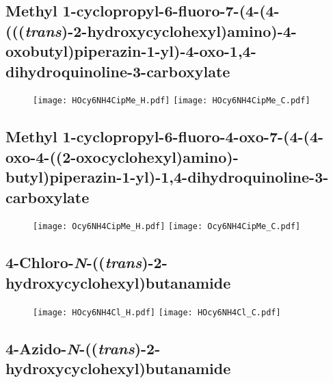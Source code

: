\subsection{Methyl 1\hyp{}cyclopropyl\hyp{}6\hyp{}fluoro\hyp{}7\hyp{}(4\hyp{}(4\hyp{}(((\textit{trans})\hyp{}2\hyp{}hydroxycyclohexyl)amino)\hyp{}4\hyp{}oxobutyl)piperazin\hyp{}1\hyp{}yl)\hyp{}4\hyp{}oxo\hyp{}1,4\hyp{}dihydroquinoline\hyp{}3\hyp{}carboxylate }

\begin{figure}[H]
	\centering
		\texttt{[image: HOcy6NH4CipMe\_H.pdf]}
		\texttt{[image: HOcy6NH4CipMe\_C.pdf]}
\end{figure}

\subsection{Methyl 1\hyp{}cyclopropyl\hyp{}6\hyp{}fluoro\hyp{}4\hyp{}oxo\hyp{}7\hyp{}(4\hyp{}(4\hyp{}oxo\hyp{}4\hyp{}((2\hyp{}oxocyclohexyl)amino)\hyp{}butyl)piperazin\hyp{}1\hyp{}yl)\hyp{}1,4\hyp{}dihydroquinoline\hyp{}3\hyp{}carboxylate }

\begin{figure}[H]
	\centering
		\texttt{[image: Ocy6NH4CipMe\_H.pdf]}
		\texttt{[image: Ocy6NH4CipMe\_C.pdf]}
\end{figure}


\subsection{4\hyp{}Chloro\hyp{}\textit{N}\hyp{}((\textit{trans})\hyp{}2\hyp{}hydroxycyclohexyl)butanamide  }

\begin{figure}[H]
	\centering
		\texttt{[image: HOcy6NH4Cl\_H.pdf]}
		\texttt{[image: HOcy6NH4Cl\_C.pdf]}
\end{figure}

\subsection{4\hyp{}Azido\hyp{}\textit{N}\hyp{}((\textit{trans})\hyp{}2\hyp{}hydroxycyclohexyl)butanamide  }

